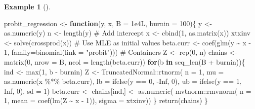 \documentclass[
  11pt,
  letterpaper,
]{scrbook}
\newenvironment{Shaded}{\begin{snugshade}}{\end{snugshade}}
\newcommand{\AttributeTok}[1]{\textcolor[rgb]{0.40,0.45,0.13}{#1}}
\newcommand{\CommentTok}[1]{\textcolor[rgb]{0.37,0.37,0.37}{#1}}
\newcommand{\ConstantTok}[1]{\textcolor[rgb]{0.56,0.35,0.01}{#1}}
\newcommand{\ControlFlowTok}[1]{\textcolor[rgb]{0.00,0.23,0.31}{\textbf{#1}}}
\newcommand{\DecValTok}[1]{\textcolor[rgb]{0.68,0.00,0.00}{#1}}
\newcommand{\FloatTok}[1]{\textcolor[rgb]{0.68,0.00,0.00}{#1}}
\newcommand{\FunctionTok}[1]{\textcolor[rgb]{0.28,0.35,0.67}{#1}}
\newcommand{\NormalTok}[1]{\textcolor[rgb]{0.00,0.23,0.31}{#1}}
\newcommand{\OtherTok}[1]{\textcolor[rgb]{0.00,0.23,0.31}{#1}}
\newcommand{\SpecialCharTok}[1]{\textcolor[rgb]{0.37,0.37,0.37}{#1}}
\newcommand{\StringTok}[1]{\textcolor[rgb]{0.13,0.47,0.30}{#1}}
\theoremstyle{definition}
\theoremstyle{definition}
\newtheorem{example}{Example}[chapter]
\theoremstyle{definition}
\theoremstyle{plain}
\theoremstyle{plain}
\theoremstyle{remark}
\begin{document}
\begin{example}[]
\begin{Shaded}
\begin{Highlighting}[]
\NormalTok{probit\_regression }\OtherTok{\textless{}{-}} \ControlFlowTok{function}\NormalTok{(y, x, }\AttributeTok{B =} \FloatTok{1e4}\NormalTok{L, }\AttributeTok{burnin =} \DecValTok{100}\NormalTok{)\{}
\NormalTok{  y }\OtherTok{\textless{}{-}} \FunctionTok{as.numeric}\NormalTok{(y)}
\NormalTok{  n }\OtherTok{\textless{}{-}} \FunctionTok{length}\NormalTok{(y)}
  \CommentTok{\# Add intercept}
\NormalTok{  x }\OtherTok{\textless{}{-}} \FunctionTok{cbind}\NormalTok{(}\DecValTok{1}\NormalTok{, }\FunctionTok{as.matrix}\NormalTok{(x))}
\NormalTok{  xtxinv }\OtherTok{\textless{}{-}} \FunctionTok{solve}\NormalTok{(}\FunctionTok{crossprod}\NormalTok{(x))}
  \CommentTok{\# Use MLE as initial values}
\NormalTok{  beta.curr }\OtherTok{\textless{}{-}} \FunctionTok{coef}\NormalTok{(}\FunctionTok{glm}\NormalTok{(y }\SpecialCharTok{\textasciitilde{}}\NormalTok{ x }\SpecialCharTok{{-}} \DecValTok{1}\NormalTok{, }\AttributeTok{family=}\FunctionTok{binomial}\NormalTok{(}\AttributeTok{link =} \StringTok{"probit"}\NormalTok{)))}
  \CommentTok{\# Containers}
\NormalTok{  Z }\OtherTok{\textless{}{-}} \FunctionTok{rep}\NormalTok{(}\DecValTok{0}\NormalTok{, n)}
\NormalTok{  chains }\OtherTok{\textless{}{-}} \FunctionTok{matrix}\NormalTok{(}\DecValTok{0}\NormalTok{, }\AttributeTok{nrow =}\NormalTok{ B, }\AttributeTok{ncol =} \FunctionTok{length}\NormalTok{(beta.curr))}
  \ControlFlowTok{for}\NormalTok{(b }\ControlFlowTok{in} \FunctionTok{seq\_len}\NormalTok{(B }\SpecialCharTok{+}\NormalTok{ burnin))\{}
\NormalTok{    ind }\OtherTok{\textless{}{-}} \FunctionTok{max}\NormalTok{(}\DecValTok{1}\NormalTok{, b }\SpecialCharTok{{-}}\NormalTok{ burnin)}
\NormalTok{    Z }\OtherTok{\textless{}{-}}\NormalTok{ TruncatedNormal}\SpecialCharTok{::}\FunctionTok{rtnorm}\NormalTok{(}
      \AttributeTok{n =} \DecValTok{1}\NormalTok{,}
      \AttributeTok{mu =} \FunctionTok{as.numeric}\NormalTok{(x }\SpecialCharTok{\%*\%}\NormalTok{ beta.curr),}
      \AttributeTok{lb =} \FunctionTok{ifelse}\NormalTok{(y }\SpecialCharTok{==} \DecValTok{0}\NormalTok{, }\SpecialCharTok{{-}}\ConstantTok{Inf}\NormalTok{, }\DecValTok{0}\NormalTok{),}
      \AttributeTok{ub =} \FunctionTok{ifelse}\NormalTok{(y }\SpecialCharTok{==} \DecValTok{1}\NormalTok{, }\ConstantTok{Inf}\NormalTok{, }\DecValTok{0}\NormalTok{),}
      \AttributeTok{sd =} \DecValTok{1}\NormalTok{)}
\NormalTok{    beta.curr }\OtherTok{\textless{}{-}}\NormalTok{ chains[ind,] }\OtherTok{\textless{}{-}} \FunctionTok{as.numeric}\NormalTok{(}
\NormalTok{      mvtnorm}\SpecialCharTok{::}\FunctionTok{rmvnorm}\NormalTok{(}
        \AttributeTok{n =} \DecValTok{1}\NormalTok{, }
        \AttributeTok{mean =} \FunctionTok{coef}\NormalTok{(}\FunctionTok{lm}\NormalTok{(Z }\SpecialCharTok{\textasciitilde{}}\NormalTok{ x }\SpecialCharTok{{-}} \DecValTok{1}\NormalTok{)),}
        \AttributeTok{sigma =}\NormalTok{ xtxinv))}
\NormalTok{  \}}
\FunctionTok{return}\NormalTok{(chains)}
\NormalTok{\}}
\end{Highlighting}
\end{Shaded}

\end{example}
\end{document}

